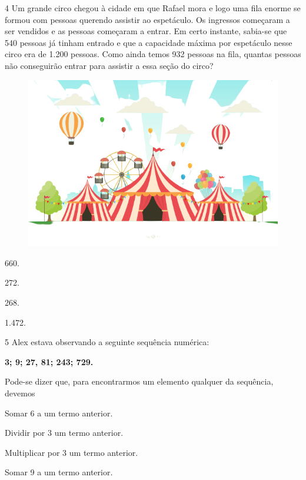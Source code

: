 \num{4} Um grande circo chegou à cidade em que Rafael mora e logo uma fila enorme se formou com pessoas querendo assistir ao espetáculo. Os ingressos começaram a ser vendidos e as pessoas começaram a entrar. Em certo instante, sabia-se que 540 pessoas já tinham entrado e que a capacidade máxima por espetáculo nesse circo era de 1.200 pessoas. Como ainda temos 932 pessoas na fila, quantas pessoas não conseguirão entrar para assistir a essa seção do circo?


\begin{figure}[htpb!]
\centering
\includegraphics[width=\textwidth]{./media/image107c.png}
\end{figure}

\begin{multicols}{2}
\begin{escolha}
\item
  660.
\item
  272.
\item
  268.
\item
  1.472.
\end{escolha}
\end{multicols}

\num{5} Alex estava observando a seguinte sequência numérica: 

\begin{myquote}
\centering
\textbf{3; 9; 27, 81; 243; 729.}
\end{myquote}

Pode-se dizer que, para encontrarmos um elemento qualquer da sequência, devemos 


\begin{escolha}
\item
  Somar 6 a um termo anterior.
\item
  Dividir por 3 um termo anterior.
\item
  Multiplicar por 3 um termo anterior.
\item
  Somar 9 a um termo anterior.
\end{escolha}

